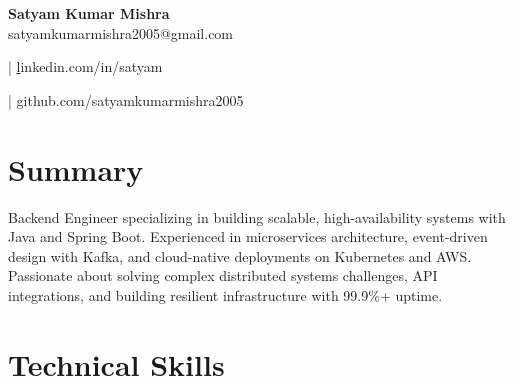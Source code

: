 \documentclass[11pt]{article}
\begin{document}

\begin{center}
{\LARGE \textbf{ Satyam Kumar Mishra }} \\

satyamkumarmishra2005@gmail.com



| \href{https://linkedin.com/in/satyam}linkedin.com/in/satyam

| \href{https://github.com/satyamkumarmishra2005}github.com/satyamkumarmishra2005


\end{center}

\vspace{6pt}




\section*{Summary}

Backend Engineer specializing in building scalable, high-availability systems with Java and Spring Boot. Experienced in microservices architecture, event-driven design with Kafka, and cloud-native deployments on Kubernetes and AWS. Passionate about solving complex distributed systems challenges, API integrations, and building resilient infrastructure with 99.9\%+ uptime.






\section*{Technical Skills}
\end{document}
